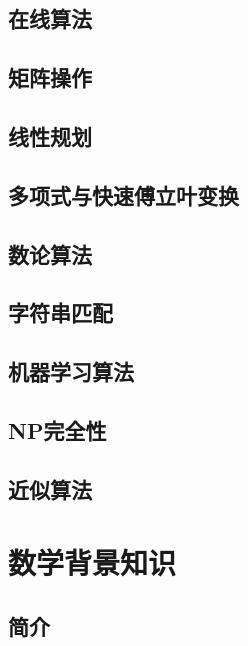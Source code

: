 \documentclass[lang=cn,newtx,10pt,scheme=chinese]{elegantbook}
\begin{document}
\chapter{在线算法}\label{chapter-27}

\chapter{矩阵操作}\label{chapter-28}

\chapter{线性规划}\label{chapter-29}

\chapter{多项式与快速傅立叶变换}\label{chapter-30}

\chapter{数论算法}\label{chapter-31}

\chapter{字符串匹配}\label{chapter-32}

\chapter{机器学习算法}\label{chapter-33}

\chapter{NP完全性}\label{chapter-34}

\chapter{近似算法}\label{chapter-35}

\appendix

\part{数学背景知识}

\chapter*{简介}
\end{document}

